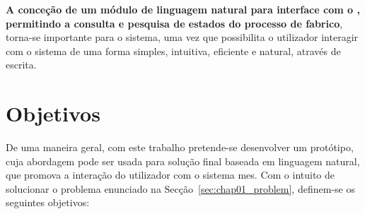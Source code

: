 \textbf{A conceção de um módulo de linguagem natural para interface com o {\productname}, permitindo a consulta e pesquisa de estados do processo de fabrico}, torna-se importante para o sistema, uma vez que possibilita o utilizador interagir com o sistema de uma forma simples, intuitiva, eficiente e natural, através de escrita.

\section{Objetivos}
\label{sec:chap01_objectives}
De uma maneira geral, com este trabalho pretende-se desenvolver um protótipo, cuja abordagem pode ser usada para solução final baseada em linguagem natural, que promova a interação do utilizador com o sistema \gls{mes}. Com o intuito de solucionar o problema enunciado na Secção~\ref{sec:chap01_problem}, definem-se os seguintes objetivos:

